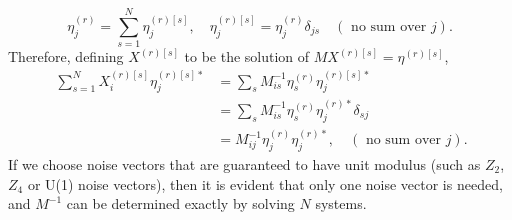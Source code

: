 \begin{equation}
    \eta_{j}^{(r)}=\sum_{s=1}^{N} \eta_{j}^{(r)[s]}, \quad \eta_{j}^{(r)[s]}=\eta_{j}^{(r)} \delta_{j s} \quad(\text { no sum over } j).
\end{equation}
Therefore, defining $X^{(r)[s]}$ to be the solution of $M X^{(r)[s]} = \eta^{(r)[s]}$,
\begin{equation}\
    \begin{aligned}
    \sum_{s=1}^{N} X_{i}^{(r)[s]} \eta_{j}^{(r)[s] *} &=\sum_{s} M_{i s}^{-1} \eta_{s}^{(r)} \eta_{j}^{(r)[s] *} \\
    &=\sum_{s} M_{i s}^{-1} \eta_{s}^{(r)} \eta_{j}^{(r) *} \delta_{s j}\\
    &=M_{i j}^{-1} \eta_{j}^{(r)} \eta_{j}^{(r) *}, \quad(\text { no sum over } j).
\end{aligned}
\end{equation}
If we choose noise vectors that are guaranteed to have unit modulus (such as $Z_2$, $Z_4$ or U(1) noise vectors), then it is evident that only one noise vector is needed, and $M^{-1}$ can be determined exactly by solving $N$ systems.

